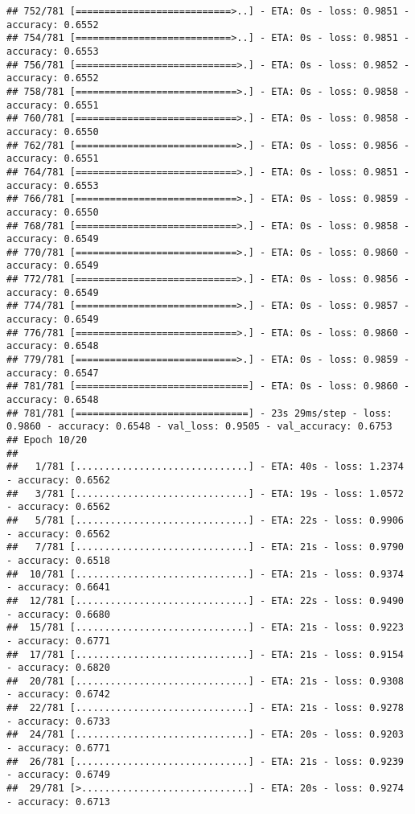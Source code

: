 \documentclass[
]{article}
\begin{document}
\begin{verbatim}
## 752/781 [===========================>..] - ETA: 0s - loss: 0.9851 - accuracy: 0.6552
## 754/781 [===========================>..] - ETA: 0s - loss: 0.9851 - accuracy: 0.6553
## 756/781 [============================>.] - ETA: 0s - loss: 0.9852 - accuracy: 0.6552
## 758/781 [============================>.] - ETA: 0s - loss: 0.9858 - accuracy: 0.6551
## 760/781 [============================>.] - ETA: 0s - loss: 0.9858 - accuracy: 0.6550
## 762/781 [============================>.] - ETA: 0s - loss: 0.9856 - accuracy: 0.6551
## 764/781 [============================>.] - ETA: 0s - loss: 0.9851 - accuracy: 0.6553
## 766/781 [============================>.] - ETA: 0s - loss: 0.9859 - accuracy: 0.6550
## 768/781 [============================>.] - ETA: 0s - loss: 0.9858 - accuracy: 0.6549
## 770/781 [============================>.] - ETA: 0s - loss: 0.9860 - accuracy: 0.6549
## 772/781 [============================>.] - ETA: 0s - loss: 0.9856 - accuracy: 0.6549
## 774/781 [============================>.] - ETA: 0s - loss: 0.9857 - accuracy: 0.6549
## 776/781 [============================>.] - ETA: 0s - loss: 0.9860 - accuracy: 0.6548
## 779/781 [============================>.] - ETA: 0s - loss: 0.9859 - accuracy: 0.6547
## 781/781 [==============================] - ETA: 0s - loss: 0.9860 - accuracy: 0.6548
## 781/781 [==============================] - 23s 29ms/step - loss: 0.9860 - accuracy: 0.6548 - val_loss: 0.9505 - val_accuracy: 0.6753
## Epoch 10/20
## 
##   1/781 [..............................] - ETA: 40s - loss: 1.2374 - accuracy: 0.6562
##   3/781 [..............................] - ETA: 19s - loss: 1.0572 - accuracy: 0.6562
##   5/781 [..............................] - ETA: 22s - loss: 0.9906 - accuracy: 0.6562
##   7/781 [..............................] - ETA: 21s - loss: 0.9790 - accuracy: 0.6518
##  10/781 [..............................] - ETA: 21s - loss: 0.9374 - accuracy: 0.6641
##  12/781 [..............................] - ETA: 22s - loss: 0.9490 - accuracy: 0.6680
##  15/781 [..............................] - ETA: 21s - loss: 0.9223 - accuracy: 0.6771
##  17/781 [..............................] - ETA: 21s - loss: 0.9154 - accuracy: 0.6820
##  20/781 [..............................] - ETA: 21s - loss: 0.9308 - accuracy: 0.6742
##  22/781 [..............................] - ETA: 21s - loss: 0.9278 - accuracy: 0.6733
##  24/781 [..............................] - ETA: 20s - loss: 0.9203 - accuracy: 0.6771
##  26/781 [..............................] - ETA: 21s - loss: 0.9239 - accuracy: 0.6749
##  29/781 [>.............................] - ETA: 20s - loss: 0.9274 - accuracy: 0.6713

\end{verbatim}
\end{document}

